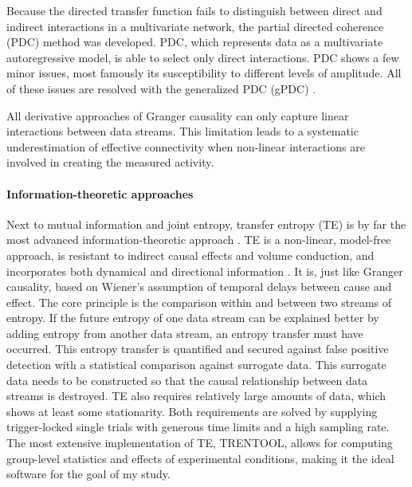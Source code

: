 Because the directed transfer function fails to distinguish between direct and indirect interactions in a multivariate network, the partial directed coherence (PDC) method was developed.
PDC, which represents data as a multivariate autoregressive model, is able to select only direct interactions.
PDC shows a few minor issues, most famously its susceptibility to different levels of amplitude.
All of these issues are resolved with the generalized PDC (gPDC) \cite{1.5.gPDC}.

All derivative approaches of Granger causality can only capture linear interactions between data streams.
This limitation leads to a systematic underestimation of effective connectivity when non-linear interactions are involved in creating the measured activity.

\paragraph{Information-theoretic approaches}
Next to mutual information and joint entropy, transfer entropy (TE) is by far the most advanced information-theoretic approach \cite{1.5.TEcomparison}.
TE is a non-linear, model-free approach, is resistant to indirect causal effects and volume conduction, and incorporates both dynamical and directional information \cite{3.4.TE}.
It is, just like Granger causality, based on Wiener's assumption of temporal delays between cause and effect.
The core principle is the comparison within and between two streams of entropy.
If the future entropy of one data stream can be explained better by adding entropy from another data stream, an entropy transfer must have occurred.
This entropy transfer is quantified and secured against false positive detection with a statistical comparison against surrogate data.
This surrogate data needs to be constructed so that the causal relationship between data streams is destroyed.
TE also requires relatively large amounts of data, which shows at least some stationarity.
Both requirements are solved by supplying trigger-locked single trials with generous time limits and a high sampling rate.
The most extensive implementation of TE, TRENTOOL, allows for computing group-level statistics and effects of experimental conditions, making it the ideal software for the goal of my study.